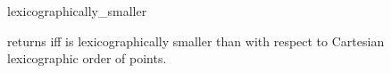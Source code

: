\begin{ccRefFunction}{lexicographically_smaller}

{returns  iff  is lexicographically smaller
 than  with respect to Cartesian lexicographic order of points.}

\end{ccRefFunction}

